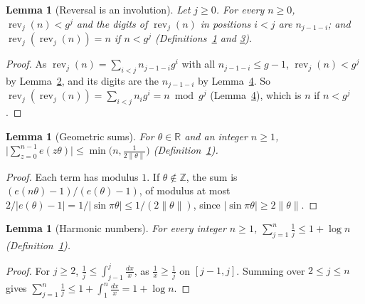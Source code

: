 \documentclass[11pt]{article}
\newcounter{hffc}
\theoremstyle{definition}\newtheorem{hffdef}[hffc]{Definition}
\theoremstyle{plain}\newtheorem{hfflem}[hffc]{Lemma}\newtheorem{hffthm}[hffc]{Theorem}
\theoremstyle{remark}\newtheorem{hffrem}[hffc]{Remark}
\newcommand{\hffcost}{}
\newcommand{\setcost}[1]{\renewcommand{\hffcost}{#1}}
\newcommand{\rev}{\operatorname{rev}}
\newcommand{\Z}{\mathbb{Z}}\newcommand{\R}{\mathbb{R}}\newcommand{\N}{\mathbb{N}}
\begin{document}
\begin{hfflem}[Reversal is an involution]\label{L:inv}
Let $j\ge0$. For every $n\ge0$, $\rev_j(n)<g^j$ and the digits of $\rev_j(n)$ in positions $i<j$ are $n_{j-1-i}$; and $\rev_j(\rev_j(n))=n$ if $n<g^j$ (Definitions~\hyperref[D:conv]{1} and \hyperref[D:digits]{3}).
\par\nopagebreak{}
\end{hfflem}
\begin{proof}\setcost{length 145/300}As $\rev_j(n)=\sum_{i<j}n_{j-1-i}g^i$ with all $n_{j-1-i}\le g-1$, $\rev_j(n)<g^j$ by Lemma~\hyperref[L:digits]{2}, and its digits are the $n_{j-1-i}$ by Lemma~\hyperref[L:window]{4}. So $\rev_j(\rev_j(n))=\sum_{i<j}n_ig^i=n\bmod g^j$ (Lemma~\hyperref[L:window]{4}), which is $n$ if $n<g^j$.
\end{proof}

\begin{hfflem}[Geometric sums]\label{L:geom}
For $\theta\in\R$ and an integer $n\ge1$, $\bigl|\sum_{z=0}^{n-1}e(z\theta)\bigr|\le\min\bigl(n,\frac1{2\|\theta\|}\bigr)$ (Definition~\hyperref[D:conv]{1}).
\par\nopagebreak{}
\end{hfflem}
\begin{proof}\setcost{length 117/300}Each term has modulus $1$. If $\theta\notin\Z$, the sum is $(e(n\theta)-1)/(e(\theta)-1)$, of modulus at most $2/|e(\theta)-1|=1/|\sin\pi\theta|\le1/(2\|\theta\|)$, since $|\sin\pi\theta|\ge2\|\theta\|$.
\end{proof}

\begin{hfflem}[Harmonic numbers]\label{L:harm1}
For every integer $n\ge1$, $\sum_{j=1}^n\frac1j\le1+\log n$ (Definition~\hyperref[D:conv]{1}).
\par\nopagebreak{}
\end{hfflem}
\begin{proof}\setcost{length 78/300}For $j\ge2$, $\frac1j\le\int_{j-1}^j\frac{dx}x$, as $\frac1x\ge\frac1j$ on $[j-1,j]$. Summing over $2\le j\le n$ gives $\sum_{j=1}^n\frac1j\le1+\int_1^n\frac{dx}x=1+\log n$.
\end{proof}
\end{document}
